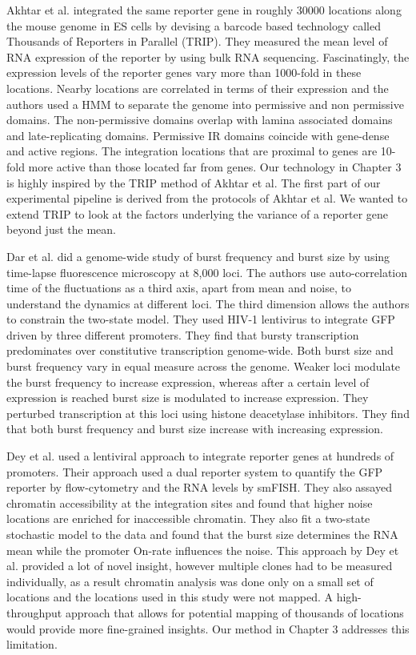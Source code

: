 Akhtar et al. \cite{akhtarw_vansteenselb:ChromatinPosition2013} integrated the same reporter gene in roughly 30000 locations along the mouse genome in ES cells by devising a barcode based technology called Thousands of Reporters in Parallel (TRIP). They measured the mean level of RNA expression of the reporter by using bulk RNA sequencing. Fascinatingly, the expression levels of the reporter genes vary more than 1000-fold in these locations. Nearby locations are correlated in terms of their expression and the authors used a HMM to separate the genome into permissive and non permissive domains. The non-permissive domains overlap with lamina associated domains and late-replicating domains. Permissive IR domains coincide with gene-dense and active regions. The integration locations that are proximal to genes are 10-fold more active than those located far from genes. Our technology in Chapter 3 is highly inspired by the TRIP method of Akhtar et al. The first part of our experimental pipeline is derived from the protocols of Akhtar et al. We wanted to extend TRIP to look at the factors underlying the variance of a reporter gene beyond just the mean.

Dar et al. \cite{dar2012pnas} did a genome-wide study of burst frequency and burst size by using time-lapse fluorescence microscopy at 8,000 loci. The authors use auto-correlation time of the fluctuations as a third axis, apart from mean and noise, to understand the dynamics at different loci. The third dimension allows the authors to constrain the two-state model. They used HIV-1 lentivirus to integrate GFP driven by three different promoters. They find that bursty transcription predominates over constitutive transcription genome-wide. Both burst size and burst frequency vary in equal measure across the genome. Weaker loci modulate the burst frequency to increase expression, whereas after a certain level of expression is reached burst size is modulated to increase expression. They perturbed transcription at this loci using histone deacetylase inhibitors. They find that both burst frequency and burst size increase with increasing expression. 

Dey et al. \cite{dey2015msb} used a lentiviral approach to integrate reporter genes at hundreds of promoters. Their approach used a dual reporter system to quantify the GFP reporter by flow-cytometry and the RNA levels by smFISH. They also assayed chromatin accessibility at the integration sites and found that higher noise locations are enriched for inaccessible chromatin. They also fit a two-state stochastic model to the data and found that the burst size determines the RNA mean while the promoter On-rate influences the noise. This approach by Dey et al. provided a lot of novel insight, however multiple clones had to be measured individually, as a result chromatin analysis was done only on a small set of locations and the locations used in this study were not mapped. A high-throughput approach that allows for potential mapping of thousands of locations would provide more fine-grained insights. Our method in Chapter 3 addresses this limitation.

